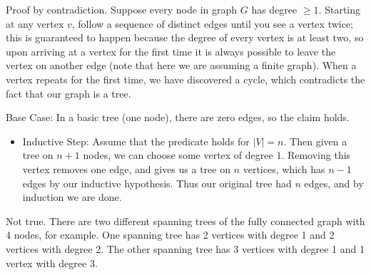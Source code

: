 \documentclass[solution, letterpaper]{cs20}
\begin{document}
\begin{solution}
\subsolution Proof by contradiction. Suppose every node in graph $G$ has degree $\geq 1$. Starting at any vertex $v$, follow a sequence of distinct edges until you see a vertex twice; this is guaranteed to happen because the degree of every vertex is at least two, so upon arriving at a vertex for the first time it is always possible to leave the vertex on another edge (note that here we are assuming a finite graph). When a vertex repeats for the first time, we have discovered a cycle, which contradicts the fact that our graph is a tree.

\subsolution Base Case: In a basic tree (one node), there are zero edges, so the claim holds. 
\begin{itemize}
\item[] Inductive Step: Assume that the predicate holds for $|V|=n.$ Then given a tree on $n+1$ nodes, we can choose some vertex of degree $1$.  Removing this vertex removes one edge, and gives us a tree on $n$ vertices, which has $n-1$ edges by our inductive hypothesis. Thus our original tree had $n$ edges, and by induction we are done.  
\end{itemize}

\subsolution Not true. There are two different spanning trees of the fully connected graph with 4 nodes, for example. One spanning tree has 2 vertices with degree 1 and 2 vertices with degree 2. The other spanning tree has 3 vertices with degree 1 and 1 vertex with degree 3.

\end{solution}
\end{document}
